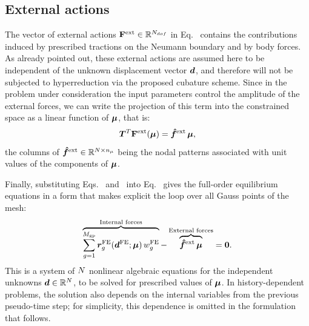 \documentclass[preprint,10pt]{elsarticle}  %
\newtheorem{remark}{Remark}
\begin{document}
\subsection{External actions}
\label{sec:FOM_external_forces}

The vector of external actions
\(\mathbf{F}^{\mathrm{ext}}\in\mathbb{R}^{N_{dof}}\) in Eq.~ contains the contributions   induced by
prescribed tractions on the Neumann boundary and by body forces. As already pointed out, these external actions are
assumed here to be independent of the unknown displacement vector \(\bm{d}\), and therefore will not be subjected to hyperreduction via the proposed  cubature scheme. Since in the problem under consideration the input parameters control the amplitude of the external forces, we can write the projection of this term into the constrained space as a linear function of $\bm{\mu}$, that is:
\begin{equation}
\label{eq:fextlift_linear}
    \bm{T}^T\mathbf{F}^{\mathrm{ext}}(\bm{\mu})
    =
    \bm{\hat{f}}^{\mathrm{ext}}\,\bm{\mu} ,
\end{equation}
 the columns of \(\bm{\hat{f}}^{\mathrm{ext}} \in \mathbb{R}^{N \times n_{\mu}}\) being  the nodal patterns
associated with unit values of the components of \(\bm{\mu}\).



%


Finally, substituting Eqs.~
and~ into
Eq.~ gives the full-order equilibrium
equations in a form that makes explicit the loop over all Gauss points of the
mesh:
\begin{equation}
\label{eq:FOM_equilibrium_general}
      \overbrace{\sum_{g=1}^{M_{\mathrm{gp}}}
    \bm{r}^{\mathrm{FE}}_{g}(\bm{d}^{\mathrm{FE}};\bm{\mu})\,w^{\mathrm{FE}}_{g}}^{\textrm{Internal forces}}
    -
    \overbrace{\bm{\hat{f}}^{\mathrm{ext}}\,\bm{\mu}}^{\textrm{External forces}}
    =
    \bm{0}.
\end{equation}
 This is a system of \(N\) nonlinear algebraic equations for the independent
unknowns \(\bm{d}\in\mathbb{R}^{N}\), to be solved for prescribed values of
\(\bm{\mu}\). In history-dependent problems, the solution also depends on the
internal variables from the previous pseudo-time step; for simplicity, this dependence is
omitted in the formulation that follows.
\end{document}
